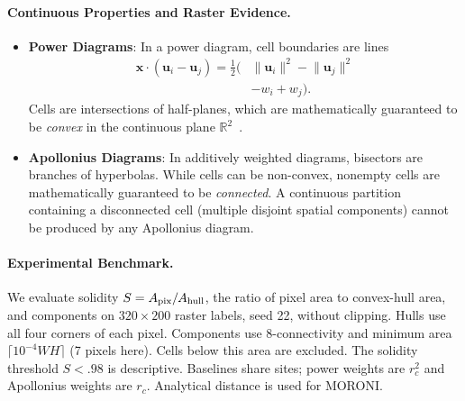 \documentclass[sigconf,nonacm]{acmart}
\begin{document}
\paragraph{Continuous Properties and Raster Evidence.}
\begin{itemize}
\item \textbf{Power Diagrams}: In a power diagram, cell boundaries are lines
\begin{equation}
\begin{aligned}
\mathbf{x}\cdot(\mathbf{u}_i-\mathbf{u}_j)
=\tfrac12\bigl(&\lVert\mathbf{u}_i\rVert^2-\lVert\mathbf{u}_j\rVert^2\\
&-w_i+w_j\bigr).
\end{aligned}
\end{equation}
Cells are intersections of half-planes, which are mathematically guaranteed to be
\emph{convex} in the continuous plane $\mathbb{R}^2$~\cite{aurenhammer1987power}.
\item \textbf{Apollonius Diagrams}: In additively weighted diagrams, bisectors
are branches of hyperbolas. While cells can be non-convex, nonempty cells are
mathematically guaranteed to be \emph{connected}. A continuous partition containing
a disconnected cell (multiple disjoint spatial components) cannot be produced by any
Apollonius diagram.
\end{itemize}

\paragraph{Experimental Benchmark.} We evaluate solidity $S=A_{\rm pix}/A_{\rm hull}$, the ratio of pixel area to convex-hull area, and components on $320\times200$
raster labels, seed 22, without clipping. Hulls use all four corners of each
pixel. Components use 8-connectivity and minimum area $\lceil10^{-4}WH\rceil$
(7 pixels here). Cells below this area are excluded. The solidity threshold
$S<.98$ is descriptive. Baselines share sites; power weights are $r_c^2$ and
Apollonius weights are $r_c$. Analytical distance is used for MORONI.
\end{document}
